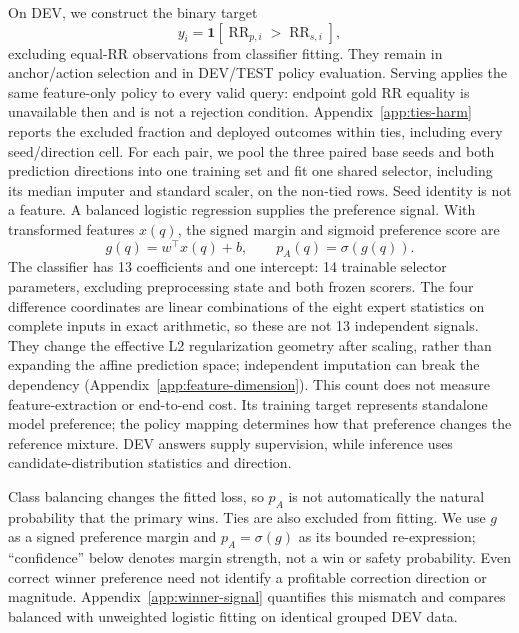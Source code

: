 \documentclass[11pt,a4paper]{article}
\newcommand{\RR}{\operatorname{RR}}
\newcommand{\ind}{\mathbf{1}}
\begin{document}
On DEV, we construct the binary target
\begin{equation}
y_i=\ind[\RR_{p,i}>\RR_{s,i}],
\label{eq:label}
\end{equation}
excluding equal-RR observations from classifier fitting. They remain in anchor/action selection and in DEV/TEST policy evaluation. Serving applies the same feature-only policy to every valid query: endpoint gold RR equality is unavailable then and is not a rejection condition. Appendix~\ref{app:ties-harm} reports the excluded fraction and deployed outcomes within ties, including every seed/direction cell. For each pair, we pool the three paired base seeds and both prediction directions into one training set and fit one shared selector, including its median imputer and standard scaler, on the non-tied rows. Seed identity is not a feature. A balanced logistic regression supplies the preference signal. With transformed features $x(q)$, the signed margin and sigmoid preference score are
\begin{equation}
g(q)=w^\top x(q)+b,
\qquad p_A(q)=\sigma(g(q)).
\label{eq:signal}
\end{equation}
The classifier has 13 coefficients and one intercept: 14 trainable selector parameters, excluding preprocessing state and both frozen scorers. The four difference coordinates are linear combinations of the eight expert statistics on complete inputs in exact arithmetic, so these are not 13 independent signals. They change the effective L2 regularization geometry after scaling, rather than expanding the affine prediction space; independent imputation can break the dependency (Appendix~\ref{app:feature-dimension}). This count does not measure feature-extraction or end-to-end cost. Its training target represents standalone model preference; the policy mapping determines how that preference changes the reference mixture. DEV answers supply supervision, while inference uses candidate-distribution statistics and direction.

Class balancing changes the fitted loss, so $p_A$ is not automatically the natural probability that the primary wins. Ties are also excluded from fitting. We use $g$ as a signed preference margin and $p_A=\sigma(g)$ as its bounded re-expression; ``confidence'' below denotes margin strength, not a win or safety probability. Even correct winner preference need not identify a profitable correction direction or magnitude. Appendix~\ref{app:winner-signal} quantifies this mismatch and compares balanced with unweighted logistic fitting on identical grouped DEV data.
\end{document}
